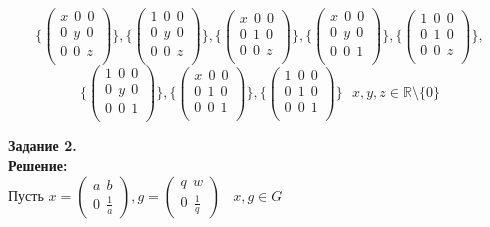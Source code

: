 \documentclass[12pt,a4paper]{scrartcl}
\begin{document}
	$$ \{ \begin{pmatrix}
	x~~0~~0\\
	0~~y~~0\\
	0~~0~~z\\
	\end{pmatrix}\}, \{ \begin{pmatrix}
	1~~0~~0\\
	0~~y~~0\\
	0~~0~~z\\
	\end{pmatrix}\}, \{ \begin{pmatrix}
	x~~0~~0\\
	0~~1~~0\\
	0~~0~~z\\
	\end{pmatrix}\}, \{ \begin{pmatrix}
	x~~0~~0\\
	0~~y~~0\\
	0~~0~~1\\
	\end{pmatrix}\}, \{ \begin{pmatrix}
	1~~0~~0\\
	0~~1~~0\\
	0~~0~~z\\
	\end{pmatrix}\}, $$ $$\{ \begin{pmatrix}
	1~~0~~0\\
	0~~y~~0\\
	0~~0~~1\\
	\end{pmatrix}\}, \{ \begin{pmatrix}
	x~~0~~0\\
	0~~1~~0\\
	0~~0~~1\\
	\end{pmatrix}\}, \{ \begin{pmatrix}
	1~~0~~0\\
	0~~1~~0\\
	0~~0~~1\\
	\end{pmatrix}\}~~~x, y, z \in \mathbb{R} \setminus \{0\}$$
	\begin{flushright}	
		\textbf{}
	\end{flushright}
	\textbf{Задание 2.}\\
	\textbf{Решение:} 
	\\
	\indent
	Пусть $x = \begin{pmatrix}
	a~~b\\
	0~~\frac{1}{a}
	\end{pmatrix}, g = \begin{pmatrix}
	q~~w\\
	0~~\frac{1}{q}
	\end{pmatrix}~~~~x, g \in G$\\
\end{document}
